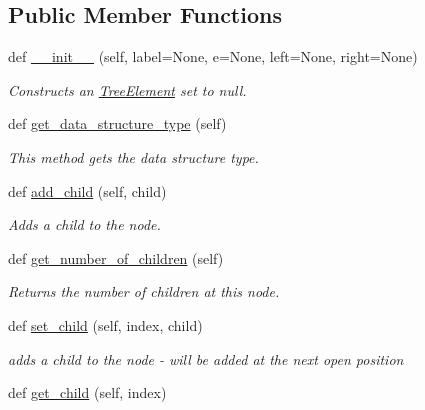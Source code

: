 \subsection*{Public Member Functions}
\begin{DoxyCompactItemize}
\item 
def \mbox{\hyperlink{class_bridges_1_1tree__element_1_1_tree_element_a62b157ce953614dc9ac28b5361c3febf}{\+\_\+\+\_\+init\+\_\+\+\_\+}} (self, label=None, e=None, left=None, right=None)
\begin{DoxyCompactList}\small\item\em Constructs an \mbox{\hyperlink{class_bridges_1_1tree__element_1_1_tree_element}{Tree\+Element}} set to null. \end{DoxyCompactList}\item 
def \mbox{\hyperlink{class_bridges_1_1tree__element_1_1_tree_element_a943d5ba52e289152f700fad7650bfc18}{get\+\_\+data\+\_\+structure\+\_\+type}} (self)
\begin{DoxyCompactList}\small\item\em This method gets the data structure type. \end{DoxyCompactList}\item 
def \mbox{\hyperlink{class_bridges_1_1tree__element_1_1_tree_element_a5cc7c317f44d0c19e76f05ed70b78bb4}{add\+\_\+child}} (self, child)
\begin{DoxyCompactList}\small\item\em Adds a child to the node. \end{DoxyCompactList}\item 
def \mbox{\hyperlink{class_bridges_1_1tree__element_1_1_tree_element_a10d73cf3beac493c8ea835326fd0d84b}{get\+\_\+number\+\_\+of\+\_\+children}} (self)
\begin{DoxyCompactList}\small\item\em Returns the number of children at this node. \end{DoxyCompactList}\item 
def \mbox{\hyperlink{class_bridges_1_1tree__element_1_1_tree_element_af6bb2b4b836002c3ebdf0fda35251df5}{set\+\_\+child}} (self, index, child)
\begin{DoxyCompactList}\small\item\em adds a child to the node -\/ will be added at the next open position \end{DoxyCompactList}\item 
def \mbox{\hyperlink{class_bridges_1_1tree__element_1_1_tree_element_a637130167474ec5ddffd62652fab2abb}{get\+\_\+child}} (self, index)

\end{DoxyCompactItemize}
